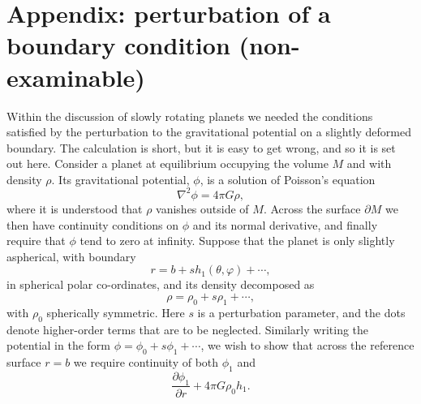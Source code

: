\section*{Appendix: perturbation of a boundary condition (non-examinable)}
Within the discussion of slowly rotating planets we needed the conditions satisfied by the perturbation to the gravitational potential 
on a slightly deformed boundary. The calculation is short, but it is easy to get wrong, and so it is set out here. Consider a planet at equilibrium occupying the volume $M$ and with density $\rho$. Its gravitational potential, $\phi$, is a solution of Poisson's equation
\begin{equation*}
    \nabla^{2}\phi=4\pi G\rho,
\end{equation*}
where it is understood that $\rho$ vanishes outside of $M$. Across the surface $\partial M$ we then have continuity conditions on $\phi$ and its normal derivative, and finally require that $\phi$ tend to zero at infinity. Suppose that the planet is only slightly aspherical, with boundary
\begin{equation*}
    r=b+sh_{1}(\theta,\varphi)+\cdots,
\end{equation*}
in spherical polar co-ordinates, and its density decomposed as
\begin{equation*}
    \rho=\rho_{0}+s\rho_{1}+\cdots,
\end{equation*}
with $\rho_{0}$ spherically symmetric. Here $s$ is a perturbation parameter, and the dots denote higher-order terms that are to be neglected. Similarly writing the potential in the form $\phi=\phi_{0}+s\phi_{1}+\cdots$, we wish to show that across the reference surface $r=b$ we require continuity of both $\phi_{1}$ and
\begin{equation*}
    \frac{\partial\phi_{1}}{\partial r}+4\pi G\rho_{0}h_{1}.
\end{equation*}


